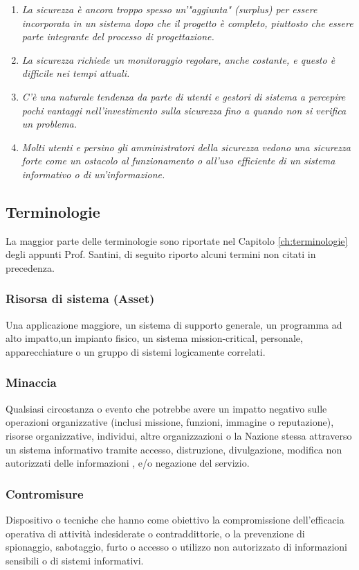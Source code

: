 \begin{enumerate}
    \item \textit{La sicurezza è ancora troppo spesso un'"aggiunta" (surplus) per essere incorporata in un sistema dopo che il progetto è completo, piuttosto che essere parte integrante del processo di progettazione.}
    \item \textit{La sicurezza richiede un monitoraggio regolare, anche costante, e questo è difficile nei tempi attuali.}
    \item \textit{C'è una naturale tendenza da parte di utenti e gestori di sistema a percepire pochi vantaggi nell'investimento sulla sicurezza fino a quando non si verifica un problema.}
    \item \textit{ Molti utenti e persino gli amministratori della sicurezza vedono una sicurezza forte come un ostacolo al funzionamento o all'uso efficiente di un sistema informativo o di un'informazione.}
\end{enumerate}

\subsection{Terminologie}
La maggior parte delle terminologie sono riportate nel Capitolo \ref{ch:terminologie} degli appunti Prof. Santini, di seguito riporto alcuni termini non citati in precedenza.

\subsubsection{Risorsa di sistema (Asset)}
Una applicazione maggiore, un sistema di supporto generale, un programma ad alto impatto,un impianto fisico, un sistema mission-critical, personale, apparecchiature o un gruppo di sistemi logicamente correlati.  

\subsubsection{Minaccia}
Qualsiasi circostanza o evento che potrebbe avere un impatto negativo sulle operazioni organizzative (inclusi missione, funzioni, immagine o reputazione), risorse organizzative, individui, altre organizzazioni o la Nazione stessa attraverso un sistema informativo tramite accesso, distruzione, divulgazione, modifica non autorizzati delle informazioni , e/o negazione del servizio.

\subsubsection{Contromisure}
Dispositivo o tecniche che hanno come obiettivo la compromissione dell'efficacia operativa di attività indesiderate o contraddittorie, o la prevenzione di spionaggio, sabotaggio, furto o accesso o utilizzo non autorizzato di informazioni sensibili o di sistemi informativi.


